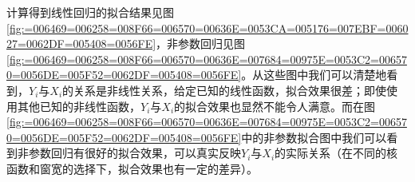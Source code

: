 \documentclass[12pt,a4paper,openany,twoside]{book}
\newcommand\hei{\CJKfamily{hei}}
\newcommand{\sihao}{\fontsize{14pt}{21pt}\selectfont}    %
\numberwithin{figure}{chapter}
\numberwithin{table}{chapter}
\numberwithin{equation}{chapter}
\begin{document}
计算得到线性回归的拟合结果见图\ref{fig:=006469=006258=008F66=006570=00636E=0053CA=005176=007EBF=006027=0062DF=005408=0056FE}，非参数回归见图\ref{fig:=006469=006258=008F66=006570=00636E=007684=00975E=0053C2=006570=0056DE=005F52=0062DF=005408=0056FE}。从这些图中我们可以清楚地看到，$Y_{i}$与$X_{i}$的关系是非线性关系，$ $给定已知的线性函数，拟合效果很差；即使使用其他已知的非线性函数，$Y_{i}$与$X_{i}$的拟合效果也显然不能令人满意。而在图\ref{fig:=006469=006258=008F66=006570=00636E=007684=00975E=0053C2=006570=0056DE=005F52=0062DF=005408=0056FE}中的非参数拟合图中我们可以看到非参数回归有很好的拟合效果，可以真实反映$Y_{i}$与$X_{i}$的实际关系（在不同的核函数和窗宽的选择下，拟合效果也有一定的差异）。$ $




%
%
\end{document}
